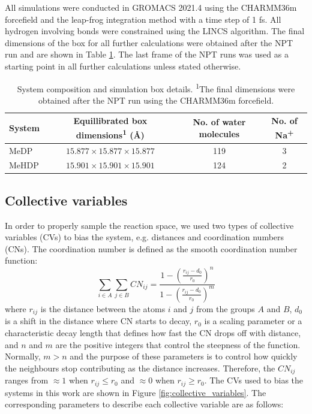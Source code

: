 All simulations were conducted in GROMACS 2021.4 \citep{abrahamGROMACSHighPerformance2015} using the CHARMM36m forcefield \citep{huangCHARMM36mImprovedForce2017} and the leap-frog integration method with a time step of 1 fs. All hydrogen involving bonds were constrained using the LINCS algorithm. The final dimensions of the box for all further calculations were obtained after the NPT run and are shown in Table \ref{tab:system-before-equilibration}. The last frame of the NPT runs was used as a starting point in all further calculations unless stated otherwise.
\begin{table}[hb]
    \centering
    \caption{System composition and simulation box details. \textsuperscript{1}The final dimensions were obtained after the NPT run using the CHARMM36m forcefield.}
    \label{tab:system-before-equilibration}
    \begin{tabular}{@{}lccc@{}}
    \toprule
    System & Equillibrated box dimensions\textsuperscript{1} (\AA) & No. of water molecules & No. of Na\textsuperscript{+} \\
    \midrule
    MeDP  & $15.877 \times 15.877 \times 15.877$ & 119 & 3 \\
    MeHDP & $15.901 \times 15.901 \times 15.901$ & 124 & 2 \\
    \bottomrule
    \end{tabular}
\end{table}



\subsection{Collective variables}
In order to properly sample the reaction space, we used two types of collective variables (CVs) to bias the system, e.g. distances and coordination numbers (CNs). The coordination number is defined as the smooth coordination number function:
\begin{equation}
    \sum_{i \in A} \sum_{j \in B} CN_{ij} = \frac{1 - \left( \frac{r_{ij} - d_0}{r_0} \right)^n}{1 - \left( \frac{r_{ij} - d_0}{r_0} \right)^m}
    \label{eq:coordination_number}
\end{equation}
where $r_{ij}$ is the distance between the atoms $i$ and $j$ from the groups $A$ and $B$, $d_0$ is a shift in the distance where CN starts to decay, $r_0$ is a scaling parameter or a characteristic decay length that defines how fast the CN drops off with distance, and $n$ and $m$ are the positive integers that control the steepness of the function. Normally, $m > n$ and the purpose of these parameters is to control how quickly the neighbours stop contributing as the distance increases. Therefore, the $CN_{ij}$ ranges from $\approx1$ when $r_{ij} \le r_0$ and $\approx0$ when $r_{ij} \ge r_0$. The CVs used to bias the systems in this work are shown in Figure \ref{fig:collective_variables}. The corresponding parameters to describe each collective variable are as follows:


